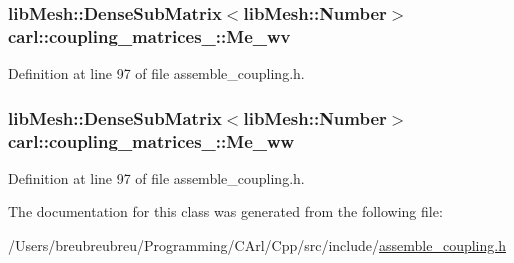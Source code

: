 \subsubsection[{Me\+\_\+wv}]{\setlength{\rightskip}{0pt plus 5cm}lib\+Mesh\+::\+Dense\+Sub\+Matrix$<$lib\+Mesh\+::\+Number$>$ carl\+::coupling\+\_\+matrices\+\_\+::\+Me\+\_\+wv}\label{classcarl_1_1coupling__matrices__3_a34a3d938e7ad54997b5d8a227614f983}


Definition at line 97 of file assemble\+\_\+coupling.\+h.

\hypertarget{classcarl_1_1coupling__matrices__3_a9b360e5c33276d238262dfe40aaa4aeb}{}
\subsubsection[{Me\+\_\+ww}]{\setlength{\rightskip}{0pt plus 5cm}lib\+Mesh\+::\+Dense\+Sub\+Matrix$<$lib\+Mesh\+::\+Number$>$ carl\+::coupling\+\_\+matrices\+\_\+::\+Me\+\_\+ww}\label{classcarl_1_1coupling__matrices__3_a9b360e5c33276d238262dfe40aaa4aeb}


Definition at line 97 of file assemble\+\_\+coupling.\+h.



The documentation for this class was generated from the following file\+:\begin{DoxyCompactItemize}
\item 
/\+Users/breubreubreu/\+Programming/\+C\+Arl/\+Cpp/src/include/\hyperlink{assemble__coupling_8h}{assemble\+\_\+coupling.\+h}\end{DoxyCompactItemize}
